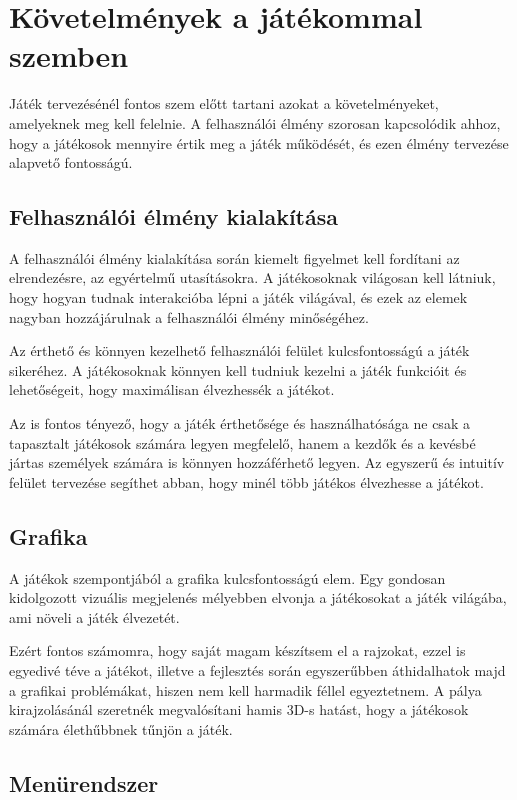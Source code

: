 \chapter{Követelmények a játékommal szemben}
Játék tervezésénél fontos szem előtt tartani azokat a követelményeket, amelyeknek meg kell felelnie. A felhasználói élmény szorosan kapcsolódik ahhoz, hogy a játékosok mennyire értik meg a játék működését, és ezen élmény tervezése alapvető fontosságú.


\section{Felhasználói élmény kialakítása}

A felhasználói élmény kialakítása során kiemelt figyelmet kell fordítani az elrendezésre, az egyértelmű utasításokra. A játékosoknak világosan kell látniuk, hogy hogyan tudnak interakcióba lépni a játék világával, és ezek az elemek nagyban hozzájárulnak a felhasználói élmény minőségéhez.

Az érthető és könnyen kezelhető felhasználói felület kulcsfontosságú a játék sikeréhez. A játékosoknak könnyen kell tudniuk kezelni a játék funkcióit és lehetőségeit, hogy maximálisan élvezhessék a játékot.

Az is fontos tényező, hogy a játék érthetősége és használhatósága ne csak a tapasztalt játékosok számára legyen megfelelő, hanem a kezdők és a kevésbé jártas személyek számára is könnyen hozzáférhető legyen. Az egyszerű és intuitív felület tervezése segíthet abban, hogy minél több játékos élvezhesse a játékot.


\section{Grafika}

A játékok szempontjából a grafika kulcsfontosságú elem. Egy gondosan kidolgozott vizuális megjelenés mélyebben elvonja a játékosokat a játék világába, ami növeli a játék élvezetét.

Ezért fontos számomra, hogy saját magam készítsem el a rajzokat, ezzel is egyedivé téve a játékot, illetve a fejlesztés során egyszerűbben áthidalhatok majd a grafikai problémákat, hiszen nem kell harmadik féllel egyeztetnem. A pálya kirajzolásánál szeretnék megvalósítani hamis 3D-s hatást, hogy a játékosok számára élethűbbnek tűnjön a játék. 


\section{Menürendszer}

